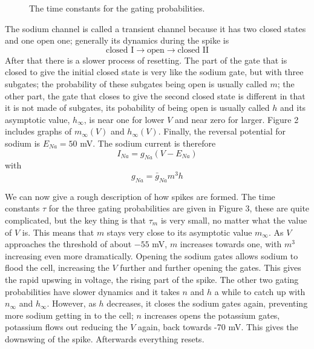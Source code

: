 \documentclass[11pt,a4paper]{scrartcl}
\begin{document}
\begin{figure}
\begin{center}

\end{center}
\caption{The time constants for the gating probabilities.\label{fig:tau_vals}}
\end{figure}


The sodium channel is called a transient channel because it has two
closed states and one open one; generally its dynamics during the
spike is
\begin{equation}
\mbox{closed I}\rightarrow \mbox{open}\rightarrow\mbox{closed II}
\end{equation}
After that there is a slower process of resetting. The part of the
gate that is closed to give the initial closed state is very like the
sodium gate, but with three subgates; the probability of these
subgates being open is usually called $m$; the other part, the gate
that closes to give the second closed state is different in that it is
not made of subgates, its pobability of being open is usually called
$h$ and its asymptotic value, $h_\infty$, is near one for lower $V$
and near zero for larger. Figure 2 includes graphs of $m_\infty(V)$
and $h_\infty(V)$. Finally, the reversal potential for sodium is
$E_{Na}=50$ mV. The sodium current is therefore
\begin{equation}
I_{Na}=g_{Na}(V-E_{Na})
\end{equation}
with
\begin{equation}
g_{Na}=\bar{g}_{Na}m^3h
\end{equation}

We can now give a rough description of how spikes are formed. The time
constants $\tau$ for the three gating probabilities are given in
Figure 3, these are quite complicated, but the key thing is that
$\tau_m$ is very small, no matter what the value of $V$ is. This means
that $m$ stays very close to its asymptotic value $m_\infty$. As $V$
approaches the threshold of about $-55$ mV, $m$ increases towards one,
with $m^3$ increasing even more dramatically. Opening the sodium gates
allows sodium to flood the cell, increasing the $V$ further and
further opening the gates. This gives the rapid upswing in voltage,
the rising part of the spike. The other two gating probabilities have
slower dynamics and it takes $n$ and $h$ a while to catch up with
$n_\infty$ and $h_\infty$. However, as $h$ decreases, it closes the
sodium gates again, preventing more sodium getting in to the cell; $n$
increases opens the potassium gates, potassium flows out reducing the
$V$ again, back towards -70 mV. This gives the downswing of the
spike. Afterwards everything resets.
\end{document}
